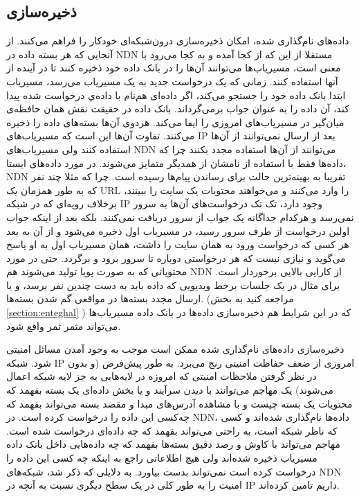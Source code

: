 \subsection{ذخیره‌سازی}
داده‌های نام‌گذاری شده، امکان ذخیره‌سازی درون‌شبکه‌ای خودکار را فراهم‌ می‌کنند. از آنجایی که هر بسته داده در NDN مستقلا از این که از کجا آمده و به کجا می‌رود با معنی است، مسیریاب‌ها می‌توانند آن‌ها را در بانک داده خود ذخیره کنند تا در آینده از آنها استفاده کنند. زمانی که یک درخواست جدید به یک مسیریاب می‌رسد، مسیریاب ابتدا بانک داده خود را جستجو می‌کند، اگر داده‌ای هم‌نام با داده‌ي درخواست شده پیدا کند، آن داده را به عنوان جواب برمی‌گرداند. بانک داده در حقیقت نقش همان حافظه‌‌ی میان‌گیر در مسیریاب‌های امروزی را ایفا می‌کند. هردوی آن‌ها بسته‌‌های داده را ذخیره‌ می‌کنند. تفاوت آن‌ها این است که مسیریاب‌‌های IP بعد از ارسال نمی‌توانند از آن‌ها استفاده کنند ولی مسیریاب‌های NDN  می‌توانند از آن‌ها استفاده مجدد بکنند چرا که داده‌‌ها فقط با استفاده از نامشان از همدیگر متمایز می‌شوند. در مورد داده‌های ایستا، NDN تقریبا به بهینه‌ترین حالت برای رساندن پیام‌ها رسیده است. چرا که مثلا چند نفر که به طور همزمان یک URL را وارد می‌کنند و می‌خواهند محتویات یک سایت را ببینند، برخلاف رویه‌ای که در شبکه IP وجود دارد، تک تک درخواست‌های آن‌ها به سرور نمی‌رسد و هرکدام جداگانه یک جواب از سرور دریافت نمی‌کنند. بلکه بعد از اینکه جواب اولین درخواست از طرف سرور رسید، در مسیریاب اول ذخیره می‌شود و از آن به بعد هر کسی که درخواست ورود به همان سایت را داشت، همان مسیریاب اول به او پاسخ می‌گوید و نیازی نیست که هر درخواستی دوباره تا سرور برود و برگردد. حتی در مورد محتویاتی که به صورت پویا تولید می‌شوند هم NDN از کارایی بالایی برخوردار است. برای مثال در یک جلسات برخط ویدیویی که داده باید به دست چندین نفر برسد، و یا ارسال مجدد بسته‌ها در مواقعی گم شدن بسته‌ها. (مراجعه کنید به بخش 
\ref{section:enteghal}
) که در این شرایط هم ذخیره‌سازی داده‌ها در بانک داده مسیریاب‌ها می‌تواند مثمر ثمر واقع شود. 

ذخیره‌سازی داده‌های نام‌گذاری شده ممکن است موجب به وجود آمدن مسائل امنیتی شود. شبکه IP امروزی از ضعف حفاظت امنیتی رنج می‌برد. به طور پیش‌فرض (و بدون در نظر گرفتن ملاحظات امنیتی که امروزه در لایه‌هایی به جز لایه شبکه اعمال می‌شوند) یک مهاجم می‌توانند با دیدن سرآیند و یا بخش داده‌ای یک بسته بفهمد که محتویات یک بسته چیست و با مشاهده آدرس‌های مبدا و مقصد بسته می‌تواند بفهمد که چه‌کسی این داده را درخواست کرده است. در NDN، داده‌ها نام‌گذاری شده‌اند و کسی که  ناظر شبکه است، به راحتی می‌تواند بفهمد که چه داده‌ای درخواست شده است. مهاجم می‌تواند با کاوش و رصد دقیق بسته‌ها بفهمد که چه داده‌هایی داخل بانک داده مسیریاب ذخیره شده‌اند ولی هیچ اطلاعاتی راجع به اینکه چه کسی این داده را درخواست کرده است نمی‌تواند بدست بیاورد. به دلایلی که ذکر شد، شبکه‌های NDN امنیت را به طور کلی در یک سطح دیگری نسبت به آنچه در IP  داریم تامین کرده‌اند. 


